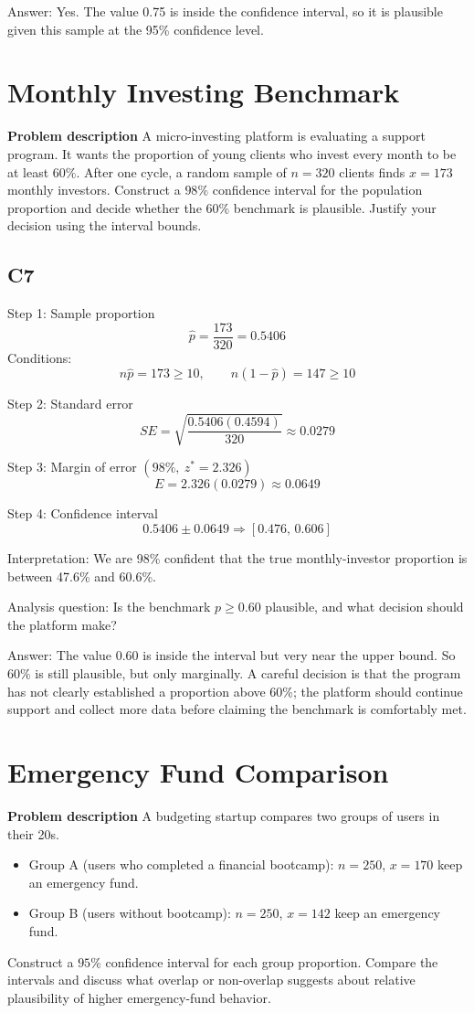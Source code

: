 	Answer: Yes. The value 0.75 is inside the confidence interval, so it is plausible given this sample at the 95\% confidence level.
	
	\section{Monthly Investing Benchmark}
	\textbf{Problem description}
	A micro-investing platform is evaluating a support program. It wants the proportion of young clients who invest every month to be at least \(60\%\). After one cycle, a random sample of \(n=320\) clients finds \(x=173\) monthly investors. Construct a \(98\%\) confidence interval for the population proportion and decide whether the \(60\%\) benchmark is plausible. Justify your decision using the interval bounds.
	
	\subsection*{C7}
	Step 1: Sample proportion
	\[
	\hat p=\frac{173}{320}=0.5406
	\]
	Conditions:
	\[
	n\hat p=173\ge 10,\qquad n(1-\hat p)=147\ge 10
	\]
	
	Step 2: Standard error
	\[
	SE=\sqrt{\frac{0.5406(0.4594)}{320}}\approx 0.0279
	\]
	
	Step 3: Margin of error \((98\%,\ z^*=2.326)\)
	\[
	E=2.326(0.0279)\approx 0.0649
	\]
	
	Step 4: Confidence interval
	\[
	0.5406\pm 0.0649\Rightarrow [0.476,\,0.606]
	\]
	
	Interpretation: We are 98\% confident that the true monthly-investor proportion is between 47.6\% and 60.6\%.
	
	Analysis question: Is the benchmark \(p\ge 0.60\) plausible, and what decision should the platform make?
	
	Answer: The value 0.60 is inside the interval but very near the upper bound. So \(60\%\) is still plausible, but only marginally. A careful decision is that the program has not clearly established a proportion above 60\%; the platform should continue support and collect more data before claiming the benchmark is comfortably met.
	
	\section{Emergency Fund Comparison}
	\textbf{Problem description}
	A budgeting startup compares two groups of users in their 20s.
	\begin{itemize}
		\item Group A (users who completed a financial bootcamp): \(n=250\), \(x=170\) keep an emergency fund.
		\item Group B (users without bootcamp): \(n=250\), \(x=142\) keep an emergency fund.
	\end{itemize}
	Construct a \(95\%\) confidence interval for each group proportion. Compare the intervals and discuss what overlap or non-overlap suggests about relative plausibility of higher emergency-fund behavior.
	
